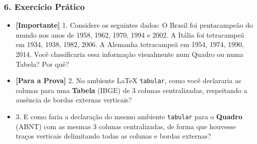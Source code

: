 \documentclass[10pt, aspectratio=169]{slidesiffmodelo}
\begin{document}
\begin{frame}[t]
    \frametitle{\color{iffgold}6. Exercício Prático}
    \begin{itemize}
        \item \textcolor{iffgreen}{\textbf{[Importante]} 1.  Considere os seguintes dados: O Brasil foi pentacampeão do mundo nos anos de 1958, 1962, 1970, 1994 e 2002. A Itália foi tetracampeã em 1934, 1938, 1982, 2006. A Alemanha tetracampeã em 1954, 1974, 1990, 2014. Você classificaria essa informação visualmente num Quadro ou numa Tabela? Por quê?}
        \item \textcolor{iffviolet}{\textbf{[Para a Prova]} 2.  No ambiente LaTeX \texttt{tabular}, como você declararia as colunas para uma \textbf{Tabela} (IBGE) de 3 colunas centralizadas, respeitando a ausência de bordas externas verticais?}
        \item 3.  E como faria a declaração do mesmo ambiente \texttt{tabular} para o \textbf{Quadro} (ABNT) com as mesmas 3 colunas centralizadas, de forma que houvesse traços verticais delimitando todas as colunas e bordas externas?
    \end{itemize}
\end{frame}
\end{document}
